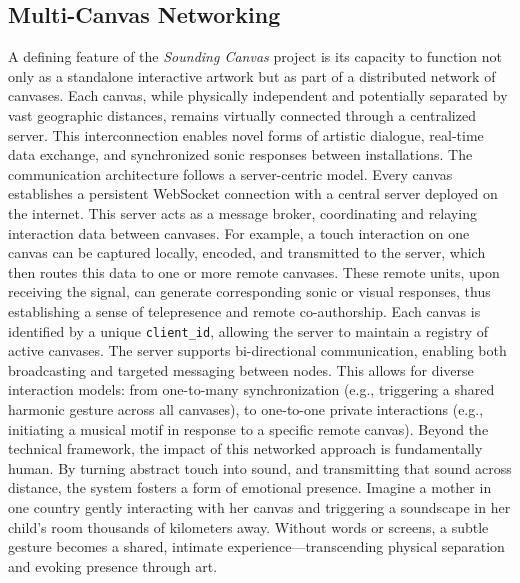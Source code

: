 \documentclass{article}
\begin{document}
\subsection{Multi-Canvas Networking}
A defining feature of the \textit{Sounding Canvas} project is its capacity to function not only as a standalone interactive artwork but as part of a distributed network of canvases. Each canvas, while physically independent and potentially separated by vast geographic distances, remains virtually connected through a centralized server. This interconnection enables novel forms of artistic dialogue, real-time data exchange, and synchronized sonic responses between installations. \newline 
The communication architecture follows a server-centric model. Every canvas establishes a persistent WebSocket connection with a central server deployed on the internet. This server acts as a message broker, coordinating and relaying interaction data between canvases. For example, a touch interaction on one canvas can be captured locally, encoded, and transmitted to the server, which then routes this data to one or more remote canvases. These remote units, upon receiving the signal, can generate corresponding sonic or visual responses, thus establishing a sense of telepresence and remote co-authorship. \newline
Each canvas is identified by a unique \texttt{client\_id}, allowing the server to maintain a registry of active canvases. The server supports bi-directional communication, enabling both broadcasting and targeted messaging between nodes. This allows for diverse interaction models: from one-to-many synchronization (e.g., triggering a shared harmonic gesture across all canvases), to one-to-one private interactions (e.g., initiating a musical motif in response to a specific remote canvas). \newline
Beyond the technical framework, the impact of this networked approach is fundamentally human. By turning abstract touch into sound, and transmitting that sound across distance, the system fosters a form of emotional presence. Imagine a mother in one country gently interacting with her canvas and triggering a soundscape in her child's room thousands of kilometers away. Without words or screens, a subtle gesture becomes a shared, intimate experience—transcending physical separation and evoking presence through art.
\end{document}
